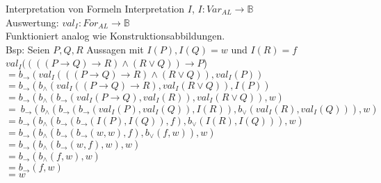 \begin{frame}{Interpretation von Formeln}
 Interpretation $I$, $I: Var_{AL}\longrightarrow\mathbb{B}$\\
 Auswertung: $val_{I}: For_{AL}\longrightarrow\mathbb{B}$\\
 Funktioniert analog wie Konstruktionsabbildungen.\\
 Bsp: Seien $P, Q, R$ Aussagen mit $I(P), I(Q) = w$ und $I(R) = f$\\
 $val_{I}((((P\rightarrow Q)\rightarrow R)\wedge(R\vee Q))\rightarrow P$)\\ %
 $=b_{\rightarrow}(val_{I}(((P\rightarrow Q)\rightarrow R)\wedge(R\vee Q)), val_{I}(P))$\\
 $=b_{\rightarrow}(b_{\wedge}(val_{I}((P\rightarrow Q)\rightarrow R),val_{I}(R\vee Q)), I(P))$\\
 $=b_{\rightarrow}(b_{\wedge}(b_{\rightarrow}(val_{I}(P\rightarrow Q), val_{I}(R)), val_{I}(R\vee Q)), w)$\\
 $=~b_{\rightarrow}(b_{\wedge}(b_{\rightarrow}(b_{\rightarrow}(val_{I}(P), val_{I}(Q)), I(R)), b_{\vee}(val_{I}(R), val_{I}(Q))), w)$\\
 $=b_{\rightarrow}(b_{\wedge}(b_{\rightarrow}(b_{\rightarrow}(I(P), I(Q)), f), b_{\vee}(I(R), I(Q))), w)$\\
 $=b_{\rightarrow}(b_{\wedge}(b_{\rightarrow}(b_{\rightarrow}(w, w), f), b_{\vee}(f, w)), w)$\\
 $=b_{\rightarrow}(b_{\wedge}(b_{\rightarrow}(w, f), w), w)$\\
 $=b_{\rightarrow}(b_{\wedge}(f, w), w)$\\
 $=b_{\rightarrow}(f, w)$\\
 $=w$\\
\end{frame}

